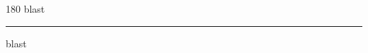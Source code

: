 
\begin{frame}
\begin{center}
\begin{turn}{180}
{\fontsize{2.5cm}{1em}\selectfont blast}
\end{turn}
\vspace{1em}\par  
\hrule
\vspace{1em}\par  
{\fontsize{2.5cm}{1em}\selectfont blast}
\end{center}
\end{frame}
